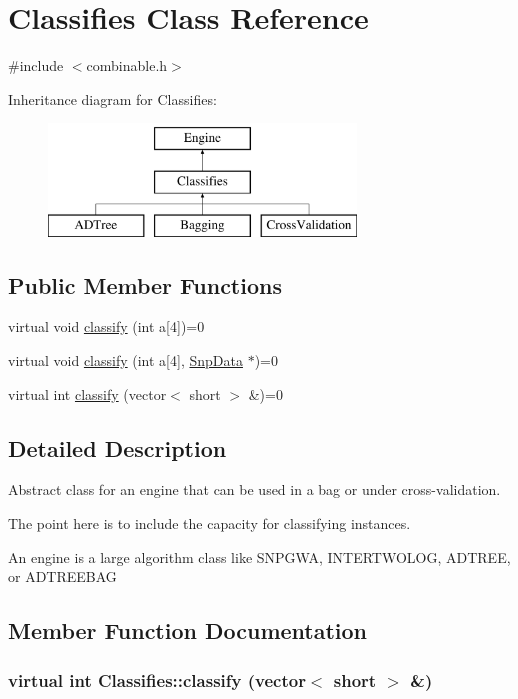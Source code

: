 \hypertarget{classClassifies}{
\section{Classifies Class Reference}
\label{classClassifies}
}


{\ttfamily \#include $<$combinable.h$>$}

Inheritance diagram for Classifies:\begin{figure}[H]
\begin{center}
\leavevmode
\includegraphics[height=3cm]{classClassifies}
\end{center}
\end{figure}
\subsection*{Public Member Functions}
\begin{DoxyCompactItemize}
\item 
virtual void \hyperlink{classClassifies_a15864d3a95edfde2bf48384c9b25c6d8}{classify} (int a\mbox{[}4\mbox{]})=0
\item 
virtual void \hyperlink{classClassifies_a7d2ae89f04af1a74eb6dd35be8eda476}{classify} (int a\mbox{[}4\mbox{]}, \hyperlink{classSnpData}{SnpData} $\ast$)=0
\item 
virtual int \hyperlink{classClassifies_a5e3d218b44024ec2c3ab3398e3dbd2e3}{classify} (vector$<$ short $>$ \&)=0
\end{DoxyCompactItemize}


\subsection{Detailed Description}
Abstract class for an engine that can be used in a bag or under cross-\/validation.

The point here is to include the capacity for classifying instances.

An engine is a large algorithm class like SNPGWA, INTERTWOLOG, ADTREE, or ADTREEBAG 

\subsection{Member Function Documentation}
\hypertarget{classClassifies_a5e3d218b44024ec2c3ab3398e3dbd2e3}{
\subsubsection[{classify}]{\setlength{\rightskip}{0pt plus 5cm}virtual int Classifies::classify (vector$<$ short $>$ \&)}}
\label{classClassifies_a5e3d218b44024ec2c3ab3398e3dbd2e3}


